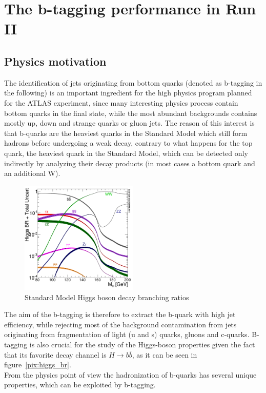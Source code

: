 \section{The b-tagging performance in Run II}\label{sec:Pix_performance}
\subsection{Physics motivation}
The identification of jets originating from bottom quarks (denoted as b-tagging in the following) is an important ingredient for the high \pt physics program planned for the ATLAS experiment, since many interesting physics process contain bottom quarks in the final state, while the most abundant backgrounds contains mostly up, down and strange quarks or gluon jets.
The reason of this interest is that b-quarks are the heaviest quarks in the Standard Model which still form hadrons before undergoing a weak decay, contrary to what happens for the top quark, the heaviest quark in the Standard Model, which can be detected only indirectly by analyzing their decay products (in most cases a bottom quark and an additional W).
\begin{figure}
\centering
\includegraphics[width=0.5\textwidth]{Images/b-tagging/Higgs_BR_LM.pdf}
\caption{Standard Model Higgs boson decay branching ratios}
\label{pic:higgs_br}
\end{figure}
The aim of the b-tagging is therefore to extract the b-quark with high jet efficiency, while rejecting most of the background contamination from jets originating from fragmentation of light (u and s) quarks, gluons and c-quarks.
B-tagging is also crucial for the study of the Higgs-boson properties given the fact that its favorite decay channel is $H\rightarrow b\overline{b}$, as it can be seen in figure~\ref{pix:higgs_br}.\\
From the physics point of view the hadronization of b-quarks has several unique properties, which can be exploited by b-tagging.
